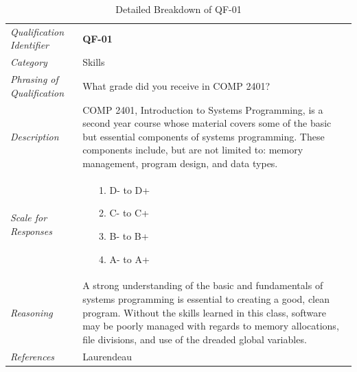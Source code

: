 \documentclass[12pt,letterpaper]{article}
\begin{document}
\begin{table}[H]
	\caption{Detailed Breakdown of QF-01}
	\begin{tabu} to 
		\toprule
		Qualification Identifier & {\bf QF-01}\\
		Category & Skills \\
		Phrasing of Qualification & What grade did you receive in COMP 2401? \\
		Description & COMP 2401, Introduction to Systems Programming, is a second year course whose material covers some of the basic but essential components of systems programming. These components include, but are not limited to: memory management, program design, and data types.\\
		Scale for Responses &
		\begin{minipage}[t]{\linewidth}
			\begin{enumerate}
				\item[1.] D- to D+
				\item[2.] C- to C+
				\item[3.] B- to B+
				\item[4.] A- to A+
			\end{enumerate}
		\end{minipage}\\
		Reasoning & A strong understanding of the basic and fundamentals of systems programming is essential to creating a good, clean program. Without the skills learned in this class, software may be poorly managed with regards to memory allocations, file divisions, and use of the dreaded global variables.\\
		References & Laurendeau\cite{claurend1}\\
		\toprule
	\end{tabu}
\end{table}
\end{document}
